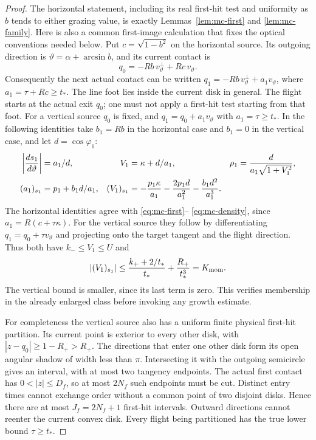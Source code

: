\begin{proof}
The horizontal statement, including its real first-hit test and
uniformity as $b$ tends to either grazing value, is exactly
Lemmas~\ref{lem:mc-first} and \ref{lem:mc-family}.  Here is also
a common first-image calculation that fixes the optical conventions
needed below.  Put $c=\sqrt{1-b^2}$ on the horizontal source.
Its outgoing direction is $\vartheta=\alpha+\arcsin b$, and
its current contact is
\[
 q_0=-Rb\,v_\vartheta^\perp+Rc\,v_\vartheta.
\]
Consequently the next actual contact can be written
$q_1=-Rb\,v_\vartheta^\perp+a_1v_\vartheta$, where
$a_1=\tau+Rc\ge t_*$.  The line foot lies inside the current
disk in general.  The flight starts at the actual exit $q_0$;
one must not apply a first-hit test starting from that foot.
For a vertical source $q_0$ is fixed, and
$q_1=q_0+a_1v_\vartheta$ with $a_1=\tau\ge t_*$.
In the following identities take $b_1=Rb$ in the horizontal case
and $b_1=0$ in the vertical case, and let $d=\cos\varphi_1$:
\begin{align}
 \left|\frac{ds_1}{d\vartheta}\right|&=a_1/d,&
 V_1&=\kappa+d/a_1,&
 \rho_1&=\frac{d}{a_1\sqrt{1+V_1^2}},
                                                        \label{eq:cs-first-identities}\\
 (a_1)_{s_1}&=p_1+b_1d/a_1,&
 (V_1)_{s_1}
   &=-\frac{p_1\kappa}{a_1}
        -\frac{2p_1d}{a_1^2}-\frac{b_1d^2}{a_1^3}.\notag
\end{align}
The horizontal identities agree with \eqref{eq:mc-first}--
\eqref{eq:mc-density}, since $a_1=R(c+\tau\kappa)$.
For the vertical source they follow by differentiating
$q_1=q_0+\tau v_\vartheta$ and projecting onto the target tangent
and the flight direction.  Thus both have $k_-\le V_1\le U$ and
\[
 |(V_1)_{s_1}|
  \le\frac{k_++2/t_*}{t_*}+\frac{R_+}{t_*^3}
  =K_{\rm mom}.
\]
The vertical bound is smaller, since its last term is zero.  This
verifies membership in the already enlarged class before invoking
any growth estimate.

For completeness the vertical source also has a uniform finite
physical first-hit partition.  Its current point is exterior to every
other disk, with $|z-q_0|\ge1-R_+>R_+$.  The directions that enter
one other disk form its open angular shadow of width less than
$\pi$.  Intersecting it with the outgoing semicircle gives an interval,
with at most two tangency endpoints.  The actual first contact has
$0<|z|\le D_f$, so at most $2N_f$ such endpoints must be cut.
Distinct entry times cannot exchange order without a common point of
two disjoint disks.  Hence there are at most $J_f=2N_f+1$ first-hit
intervals.  Outward directions cannot reenter the current convex disk.
Every flight being partitioned has the true lower bound $\tau\ge t_*$.


\end{proof}
